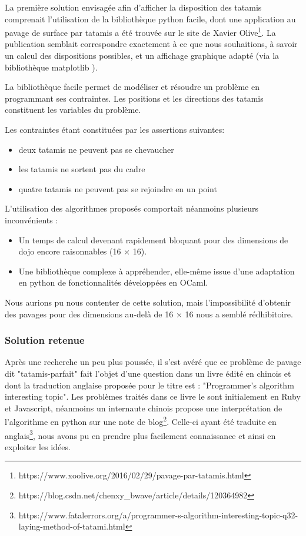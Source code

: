 La première solution envisagée afin d’afficher la disposition des tatamis comprenait l’utilisation
de la bibliothèque python facile, dont une application au pavage de surface par tatamis a été trouvée
sur le site de Xavier Olive\footnote{https://www.xoolive.org/2016/02/29/pavage-par-tatamis.html}.  La publication semblait correspondre exactement à ce que nous souhaitions,
à savoir un calcul des dispositions possibles, et un affichage graphique adapté (via la bibliothèque matplotlib ).

La bibliothèque facile permet de modéliser et résoudre un problème en programmant ses contraintes.
Les positions et les directions des tatamis constituent les variables du problème.

Les contraintes étant constituées par les assertions suivantes:

\begin{itemize}
    \item deux tatamis ne peuvent pas se chevaucher
    \item les tatamis ne sortent pas du cadre
    \item quatre tatamis ne peuvent pas se rejoindre en un point
\end{itemize}

L’utilisation des algorithmes proposés comportait néanmoins plusieurs inconvénients :

\begin{itemize}
    \item Un temps de calcul devenant rapidement bloquant pour des dimensions de dojo encore raisonnables (16 $\times$ 16).
    \item Une bibliothèque complexe à appréhender, elle-même issue d’une adaptation en python
          de fonctionnalités développées en OCaml.
\end{itemize}

Nous aurions pu nous contenter de cette solution, mais l’impossibilité d’obtenir des pavages
pour des dimensions au-delà de 16 $\times$ 16 nous a semblé rédhibitoire.

\subsubsection{Solution retenue}

Après une recherche un peu plus poussée, il s'est avéré que ce problème de pavage dit "tatamis-parfait"
fait l'objet d'une question dans un livre édité en chinois et dont la traduction anglaise proposée pour le titre
est : "Programmer's algorithm interesting topic". Les problèmes traités dans ce livre le sont initialement en Ruby et Javascript,
néanmoins un internaute chinois propose une interprétation de l'algorithme en python sur une note de
blog\footnote{https://blog.csdn.net/chenxy\_bwave/article/details/120364982}\label{chenxy}.
Celle-ci ayant été traduite en anglais\footnote{https://www.fatalerrors.org/a/programmer-s-algorithm-interesting-topic-q32-laying-method-of-tatami.html},
nous avons pu en prendre plus facilement connaissance et ainsi en exploiter les idées.\\

